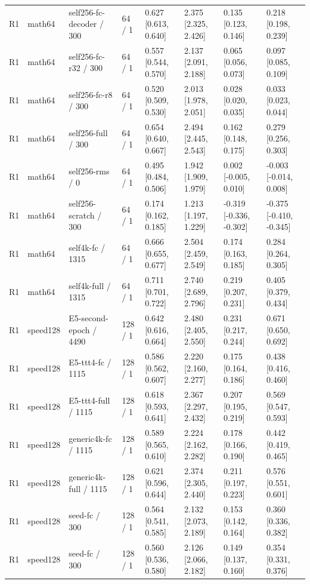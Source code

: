 \begin{tabular}{llllllll}
R1 & math64 & self256-fc-decoder / 300 & 64 / 1 & 0.627 [0.613, 0.640] & 2.375 [2.325, 2.426] & 0.135 [0.123, 0.146] & 0.218 [0.198, 0.239] \\
R1 & math64 & self256-fc-r32 / 300 & 64 / 1 & 0.557 [0.544, 0.570] & 2.137 [2.091, 2.188] & 0.065 [0.056, 0.073] & 0.097 [0.085, 0.109] \\
R1 & math64 & self256-fc-r8 / 300 & 64 / 1 & 0.520 [0.509, 0.530] & 2.013 [1.978, 2.051] & 0.028 [0.020, 0.035] & 0.033 [0.023, 0.044] \\
R1 & math64 & self256-full / 300 & 64 / 1 & 0.654 [0.640, 0.667] & 2.494 [2.445, 2.543] & 0.162 [0.148, 0.175] & 0.279 [0.256, 0.303] \\
R1 & math64 & self256-rms / 0 & 64 / 1 & 0.495 [0.484, 0.506] & 1.942 [1.909, 1.979] & 0.002 [-0.005, 0.010] & -0.003 [-0.014, 0.008] \\
R1 & math64 & self256-scratch / 300 & 64 / 1 & 0.174 [0.162, 0.185] & 1.213 [1.197, 1.229] & -0.319 [-0.336, -0.302] & -0.375 [-0.410, -0.345] \\
R1 & math64 & self4k-fc / 1315 & 64 / 1 & 0.666 [0.655, 0.677] & 2.504 [2.459, 2.549] & 0.174 [0.163, 0.185] & 0.284 [0.264, 0.305] \\
R1 & math64 & self4k-full / 1315 & 64 / 1 & 0.711 [0.701, 0.722] & 2.740 [2.689, 2.796] & 0.219 [0.207, 0.231] & 0.405 [0.379, 0.434] \\
R1 & speed128 & E5-second-epoch / 4490 & 128 / 1 & 0.642 [0.616, 0.664] & 2.480 [2.405, 2.550] & 0.231 [0.217, 0.244] & 0.671 [0.650, 0.692] \\
R1 & speed128 & E5-ttt4-fc / 1115 & 128 / 1 & 0.586 [0.562, 0.607] & 2.220 [2.160, 2.277] & 0.175 [0.164, 0.186] & 0.438 [0.416, 0.460] \\
R1 & speed128 & E5-ttt4-full / 1115 & 128 / 1 & 0.618 [0.593, 0.641] & 2.367 [2.297, 2.432] & 0.207 [0.195, 0.219] & 0.569 [0.547, 0.593] \\
R1 & speed128 & generic4k-fc / 1115 & 128 / 1 & 0.589 [0.565, 0.610] & 2.224 [2.162, 2.282] & 0.178 [0.166, 0.190] & 0.442 [0.419, 0.465] \\
R1 & speed128 & generic4k-full / 1115 & 128 / 1 & 0.621 [0.596, 0.644] & 2.374 [2.305, 2.440] & 0.211 [0.197, 0.223] & 0.576 [0.551, 0.601] \\
R1 & speed128 & seed-fc / 300 & 128 / 1 & 0.564 [0.541, 0.585] & 2.132 [2.073, 2.189] & 0.153 [0.142, 0.164] & 0.360 [0.336, 0.382] \\
R1 & speed128 & seed-fc / 300 & 128 / 1 & 0.560 [0.536, 0.580] & 2.126 [2.066, 2.182] & 0.149 [0.137, 0.160] & 0.354 [0.331, 0.376] \\

\end{tabular}
